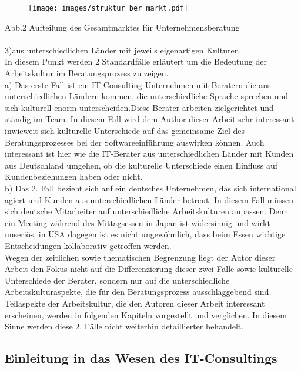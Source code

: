 \begin{figure}[htp]
\centering
\texttt{[image: images/struktur\_ber\_markt.pdf]}
\end{figure}
Abb.2 Aufteilung des Gesamtmarktes für Unternehmensberatung\\
\\
3)aus unterschiedlichen Länder mit jeweils eigenartigen Kulturen.\\
 In diesem Punkt werden 2 Standardfälle erläutert um die Bedeutung der Arbeitskultur im Beratungsprozess zu zeigen.\\
 a) Das erste Fall ist ein IT-Consulting Unternehmen mit Beratern die aus unterschiedlichen Ländern kommen, die unterschiedliche Sprache sprechen und sich kulturell enorm unterscheiden.Diese Berater arbeiten zielgerichtet und ständig im Team. In diesem Fall wird dem Author dieser Arbeit sehr interessant inwieweit sich kulturelle Unterschiede auf das gemeinsame Ziel des Beratungsprozesses bei der Softwareeinführung auswirken können. Auch interessant ist hier wie die IT-Berater aus unterschiedlichen Länder mit Kunden aus Deutschland umgehen, ob die kulturelle Unterschiede einen Einfluss auf Kundenbeziehungen haben oder nicht. \\
 b) Das 2. Fall bezieht sich auf ein deutsches Unternehmen, das sich international agiert und Kunden aus unterschiedlichen Länder betreut. In diesem Fall müssen sich deutsche Mitarbeiter auf unterschiedliche Arbeitskulturen anpassen. Denn ein Meeting während des Mittagsessen in Japan ist widersinnig und wirkt unseriös, in USA dagegen ist es nicht ungewöhnlich, dass beim Essen wichtige Entscheidungen kollaborativ getroffen werden.  \\
Wegen der zeitlichen sowie thematischen Begrenzung liegt der Autor dieser Arbeit den Fokus nicht auf die Differenzierung dieser zwei Fälle sowie kulturelle Unterschiede der Berater, sondern nur auf die unterschiedliche Arbeitskulturaspekte, die für den Beratungsprozess ausschlaggebend sind. Teilaspekte der Arbeitskultur, die den Autoren dieser Arbeit interessant erscheinen, werden in folgenden Kapiteln vorgestellt und verglichen. In diesem Sinne werden diese 2. Fälle nicht weiterhin detaillierter behandelt.

\subsection{Einleitung in das Wesen des IT-Consultings}	

